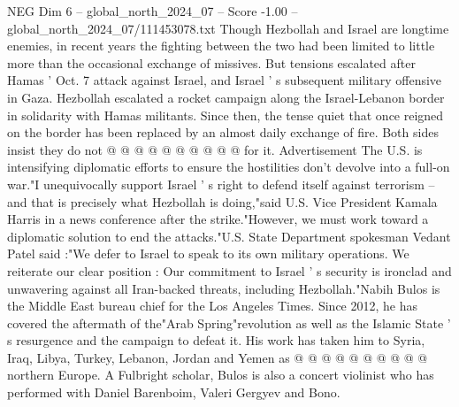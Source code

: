 \begin{textsample}{NEG Dim 6 – global\_north\_2024\_07 – Score -1.00 – global\_north\_2024\_07/111453078.txt}
Though Hezbollah and Israel are longtime enemies, in recent years the fighting between the two had been limited to little more than the occasional exchange of missives.
But tensions escalated after Hamas ' Oct. 7 attack against Israel, and Israel ' s subsequent military offensive in Gaza.
Hezbollah escalated a rocket campaign along the Israel-Lebanon border in solidarity with Hamas militants.
Since then, the tense quiet that once reigned on the border has been replaced by an almost daily exchange of fire.
Both sides insist they do not @ @ @ @ @ @ @ @ @ @ for it.
Advertisement The U.S. is intensifying diplomatic efforts to ensure the hostilities don't devolve into a full-on war."I unequivocally support Israel ' s right to defend itself against terrorism -- and that is precisely what Hezbollah is doing,"said U.S.
Vice President Kamala Harris in a news conference after the strike."However, we must work toward a diplomatic solution to end the attacks."U.S.
State Department spokesman Vedant Patel said :"We defer to Israel to speak to its own military operations.
We reiterate our clear position : Our commitment to Israel ' s security is ironclad and unwavering against all Iran-backed threats, including Hezbollah."Nabih Bulos is the Middle East bureau chief for the Los Angeles Times.
Since 2012, he has covered the aftermath of the"Arab Spring"revolution as well as the Islamic State ' s resurgence and the campaign to defeat it.
His work has taken him to Syria, Iraq, Libya, Turkey, Lebanon, Jordan and Yemen as @ @ @ @ @ @ @ @ @ @ northern Europe.
A Fulbright scholar, Bulos is also a concert violinist who has performed with Daniel Barenboim, Valeri Gergyev and Bono.

\end{textsample}

